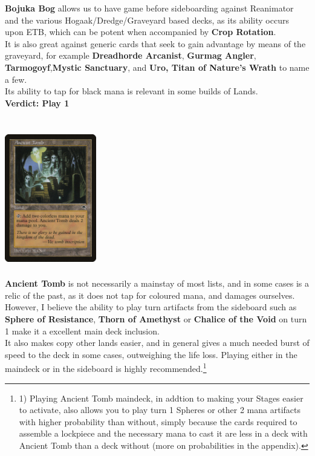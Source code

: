 \documentclass{report}
\begin{document}
\textbf{Bojuka Bog} allows us to have game before sideboarding against Reanimator and the various Hogaak/Dredge/Graveyard based decks, as its ability occurs upon ETB, which can be potent when accompanied by \textbf{Crop Rotation}.\\It is also great against generic cards that seek to gain advantage by means of the graveyard, for example \textbf{Dreadhorde Arcanist}, \textbf{Gurmag Angler}, \textbf{Tarmogoyf},\textbf{Mystic Sanctuary}, and \textbf{Uro, Titan of Nature's Wrath} to name a few.\\Its ability to tap for black mana is relevant in some builds of Lands.\\
\textbf{Verdict: Play 1}\\\\
\begin{center}
\includegraphics [width = 4cm, height = 6cm] {ancient-tomb}
\end{center}
\textbf{Ancient Tomb} is not necessarily a mainstay of most lists, and in some cases is a relic of the past, as it does not tap for coloured mana, and damages ourselves. However, I believe the ability to play turn artifacts from the sideboard such as \textbf{Sphere of Resistance}, \textbf{Thorn of Amethyst} or \textbf{Chalice of the Void} on turn 1 make it a excellent main deck inclusion.\\ It also makes copy other lands easier, and in general gives a much needed burst of speed to the deck in some cases, outweighing the life loss. Playing either in the maindeck or in the sideboard is highly recommended.\footnote{1) Playing Ancient Tomb maindeck, in addtion to making your Stages easier to activate, also allows you to play turn 1 Spheres or other 2 mana artifacts with higher probability than without, simply because the cards required to assemble a lockpiece and the necessary mana to cast it are less in a deck with Ancient Tomb than a deck without (more on probabilities in the appendix).}\\
\end{document}
